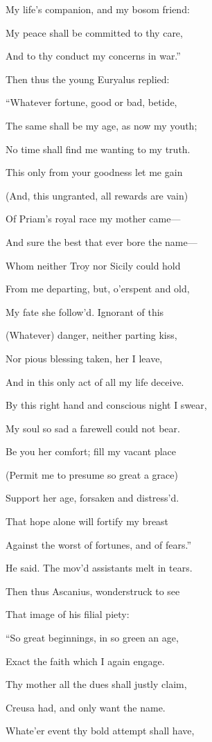 My life’s companion, and my bosom friend:

My peace shall be committed to thy care,

And to thy conduct my concerns in war.”

Then thus the young Euryalus replied:

“Whatever fortune, good or bad, betide,

The same shall be my age, as now my youth;

No time shall find me wanting to my truth.

This only from your goodness let me gain

(And, this ungranted, all rewards are vain)

Of Priam’s royal race my mother came—

And sure the best that ever bore the name—

Whom neither Troy nor Sicily could hold

From me departing, but, o’erspent and old,

My fate she follow’d. Ignorant of this

(Whatever) danger, neither parting kiss,

Nor pious blessing taken, her I leave,

And in this only act of all my life deceive.

By this right hand and conscious night I swear,

My soul so sad a farewell could not bear.

Be you her comfort; fill my vacant place

(Permit me to presume so great a grace)

Support her age, forsaken and distress’d.

That hope alone will fortify my breast

Against the worst of fortunes, and of fears.”

He said. The mov’d assistants melt in tears.

Then thus Ascanius, wonderstruck to see

That image of his filial piety:

“So great beginnings, in so green an age,

Exact the faith which I again engage.

Thy mother all the dues shall justly claim,

Creusa had, and only want the name.

Whate’er event thy bold attempt shall have,

